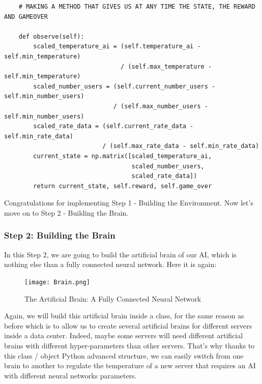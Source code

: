 \documentclass[]{book}
\begin{document}
\begin{lstlisting}
    # MAKING A METHOD THAT GIVES US AT ANY TIME THE STATE, THE REWARD AND GAMEOVER
    
    def observe(self):
        scaled_temperature_ai = (self.temperature_ai - self.min_temperature)
                                / (self.max_temperature - self.min_temperature)
        scaled_number_users = (self.current_number_users - self.min_number_users)
                              / (self.max_number_users - self.min_number_users)
        scaled_rate_data = (self.current_rate_data - self.min_rate_data)
                           / (self.max_rate_data - self.min_rate_data)
        current_state = np.matrix([scaled_temperature_ai,
                                   scaled_number_users,
                                   scaled_rate_data])
        return current_state, self.reward, self.game_over
\end{lstlisting}

Congratulations for implementing Step 1 - Building the Environment. Now let's move on to Step 2 - Building the Brain.

\newpage

\subsubsection{Step 2: Building the Brain}

In this Step 2, we are going to build the artificial brain of our AI, which is nothing else than a fully connected neural network. Here it is again:

\begin{figure}[!htbp]
        \begin{center}
            \texttt{[image: Brain.png]}
            \caption{The Artificial Brain: A Fully Connected Neural Network}
        \end{center}
\end{figure}

Again, we will build this artificial brain inside a class, for the same reason as before which is to allow us to create several artificial brains for different servers inside a data center. Indeed, maybe some servers will need different artificial brains with different hyper-parameters than other servers. That's why thanks to this class / object Python advanced structure, we can easily switch from one brain to another to regulate the temperature of a new server that requires an AI with different neural networks parameters.
\end{document}
